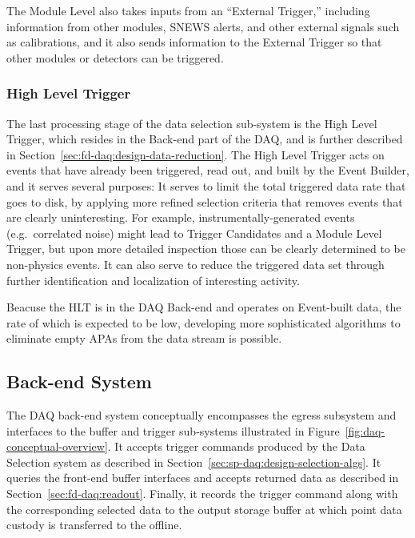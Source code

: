 The Module Level also takes inputs 
from an “External Trigger,” including information from other
modules, SNEWS alerts, and other external signals such as
calibrations, 
and it also sends information to the External Trigger so that other modules or
detectors can be triggered.

\subsubsection{High Level Trigger}

The last processing stage of the data selection sub-system is the High
Level Trigger, which resides in the
Back-end part of the DAQ, and is further described in Section~\ref{sec:fd-daq:design-data-reduction}. The High Level Trigger acts on events that have already been triggered, read out,
and built by the Event Builder, and it serves several purposes: It
serves to limit the total triggered data rate that goes to disk, by
applying more refined selection criteria that removes events that are clearly uninteresting. For example, instrumentally-generated events
(e.g.~correlated noise) might lead to Trigger Candidates and a Module
Level Trigger, but upon more detailed inspection those can be clearly determined
to be non-physics events. It can also serve to reduce the triggered
data set through further identification and localization of
interesting activity.

Beacuse the HLT is in the DAQ Back-end and operates on Event-built data, the rate
of which is expected to be low, developing more sophisticated
algorithms to eliminate empty APAs from the data 
stream is possible.

\subsection{Back-end System}
\label{sec:fd-daq:design-backend}

The DAQ back-end system conceptually encompasses the egress subsystem and interfaces to the buffer and trigger sub-systems illustrated in Figure~\ref{fig:daq-conceptual-overview}. 
It accepts trigger commands produced by the Data Selection system as described in Section~\ref{sec:sp-daq:design-selection-algs}. 
It queries the front-end buffer interfaces and accepts returned data as described in Section~\ref{sec:fd-daq:readout}. 
Finally, it records the trigger command along with the corresponding selected data to the output storage buffer at which point data custody is transferred to the offline.

